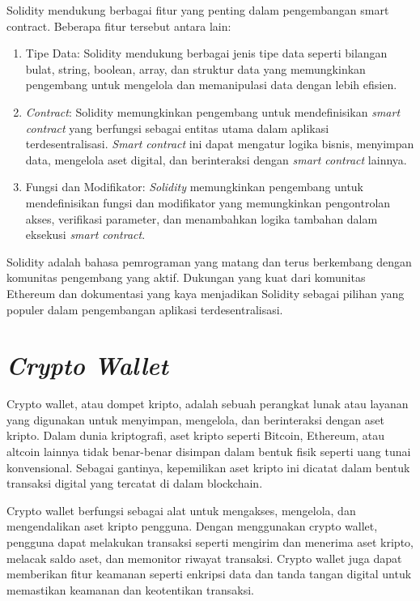 Solidity mendukung berbagai fitur yang penting dalam pengembangan smart contract. Beberapa fitur tersebut antara lain:
\begin{enumerate}
  \item Tipe Data: Solidity mendukung berbagai jenis tipe data seperti bilangan bulat, string, boolean, array, dan struktur data yang memungkinkan pengembang untuk mengelola dan memanipulasi data dengan lebih efisien.
  \item \emph{Contract}: Solidity memungkinkan pengembang untuk mendefinisikan \emph{smart contract} yang berfungsi sebagai entitas utama dalam aplikasi terdesentralisasi. \emph{Smart contract} ini dapat mengatur logika bisnis,
        menyimpan data, mengelola aset digital, dan berinteraksi dengan \emph{smart contract} lainnya.
  \item Fungsi dan Modifikator: \emph{Solidity} memungkinkan pengembang untuk mendefinisikan fungsi dan modifikator yang memungkinkan pengontrolan akses, verifikasi parameter, dan menambahkan logika tambahan dalam eksekusi \emph{smart contract}.
\end{enumerate}

Solidity adalah bahasa pemrograman yang matang dan terus berkembang dengan komunitas pengembang yang aktif. Dukungan yang kuat dari komunitas Ethereum dan dokumentasi yang kaya menjadikan
Solidity sebagai pilihan yang populer dalam pengembangan aplikasi terdesentralisasi.

\section{\emph{Crypto Wallet}}
Crypto wallet, atau dompet kripto, adalah sebuah perangkat lunak atau layanan yang digunakan untuk menyimpan, mengelola, dan berinteraksi dengan aset kripto. Dalam dunia kriptografi, aset kripto seperti Bitcoin, Ethereum, atau altcoin
lainnya tidak benar-benar disimpan dalam bentuk fisik seperti uang tunai konvensional. Sebagai gantinya, kepemilikan aset kripto ini dicatat dalam bentuk transaksi digital yang tercatat di dalam blockchain.

Crypto wallet berfungsi sebagai alat untuk mengakses, mengelola, dan mengendalikan aset kripto pengguna. Dengan menggunakan crypto wallet, pengguna dapat melakukan transaksi seperti mengirim dan menerima aset kripto, melacak saldo aset,
dan memonitor riwayat transaksi. Crypto wallet juga dapat memberikan fitur keamanan seperti enkripsi data dan tanda tangan digital untuk memastikan keamanan dan keotentikan transaksi. \parencite{noauthor_introduction_crypto_nodate}

